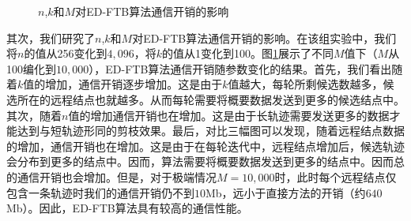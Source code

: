\begin{figure}[!t]
	\centering
		\centering
		\caption{$n$,$k$和$M$对ED-FTB算法通信开销的影响}
		\label{fig:costKM}
\end{figure}
其次，我们研究了$n$,$k$和$M$对ED-FTB算法通信开销的影响。在该组实验中，我们将$n$的值从256变化到$4,096$，将$k$的值从1变化到100。图\ref{fig:costKM}展示了不同$M$值下（$M$从100编化到$10,000$），ED-FTB算法通信开销随参数变化的结果。首先，我们看出随着$k$值的增加，通信开销逐步增加。这是由于$k$值越大，每轮所剩候选数越多，候选所在的远程结点也就越多。从而每轮需要将概要数据发送到更多的候选结点中。其次，随着$n$值的增加通信开销也在增加。这是由于长轨迹需要发送更多的数据才能达到与短轨迹形同的剪枝效果。最后，对比三幅图可以发现，随着远程结点数据的增加，通信开销也在增加。这是由于在每轮迭代中，远程结点增加后，候选轨迹会分布到更多的结点中。因而，算法需要将概要数据发送到更多的结点中。因而总的通信开销也会增加。但是，对于极端情况$M=10,000$时，此时每个远程结点仅包含一条轨迹时我们的通信开销仍不到$10$Mb，远小于直接方法的开销（约$640$Mb）。因此，ED-FTB算法具有较高的通信性能。

